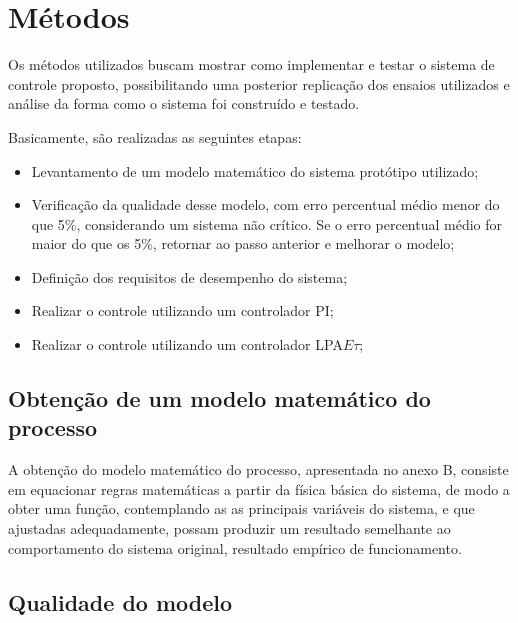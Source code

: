 \section{ Métodos }

Os métodos utilizados buscam mostrar como implementar e testar o
sistema de controle proposto, possibilitando uma posterior replicação
dos ensaios utilizados e análise da forma como o sistema foi
construído e testado.


Basicamente, são realizadas as seguintes etapas:

\begin{itemize}
\item Levantamento de um modelo matemático do sistema protótipo utilizado;
\item Verificação da qualidade desse modelo, com erro percentual médio
  menor do que 5\%, considerando um sistema não crítico. Se o erro
  percentual médio for maior do que os 5\%, retornar ao passo anterior e
  melhorar o modelo;
\item Definição dos requisitos de desempenho do sistema;
\item Realizar o controle utilizando um controlador PI;
\item Realizar o controle utilizando um controlador LPA$E\tau$;
\end{itemize}




\subsection{ Obtenção de um modelo matemático do processo }

A obtenção do modelo matemático do processo,
apresentada no anexo B, consiste em equacionar
regras matemáticas a partir da física básica do sistema,
de modo a obter uma função,
contemplando as as principais variáveis do sistema,
e que ajustadas adequadamente,
possam produzir um resultado semelhante ao comportamento do sistema
original, resultado empírico de funcionamento.



\subsection{ Qualidade do modelo }

